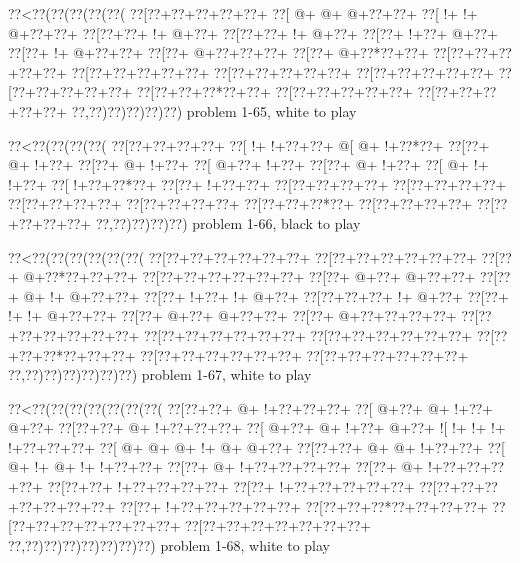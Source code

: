 \vbox{\vbox{\goo
\0??<\0??(\0??(\0??(\0??(\0??(
\0??[\0??+\0??+\0??+\0??+\0??+
\0??[\- @+\- @+\- @+\0??+\0??+
\0??[\- !+\- !+\- @+\0??+\0??+
\0??[\0??+\0??+\- !+\- @+\0??+
\0??[\0??+\0??+\- !+\- @+\0??+
\0??[\0??+\- !+\0??+\- @+\0??+
\0??[\0??+\- !+\- @+\0??+\0??+
\0??[\0??+\- @+\0??+\0??+\0??+
\0??[\0??+\- @+\0??*\0??+\0??+
\0??[\0??+\0??+\0??+\0??+\0??+
\0??[\0??+\0??+\0??+\0??+\0??+
\0??[\0??+\0??+\0??+\0??+\0??+
\0??[\0??+\0??+\0??+\0??+\0??+
\0??[\0??+\0??+\0??+\0??+\0??+
\0??[\0??+\0??+\0??*\0??+\0??+
\0??[\0??+\0??+\0??+\0??+\0??+
\0??[\0??+\0??+\0??+\0??+\0??+
\0??,\0??)\0??)\0??)\0??)\0??)
}
\hfil problem 1-65, white to play\hfil\break
}

\vbox{\vbox{\goo
\0??<\0??(\0??(\0??(\0??(
\0??[\0??+\0??+\0??+\0??+
\0??[\- !+\- !+\0??+\0??+
\- @[\- @+\- !+\0??*\0??+
\0??[\0??+\- @+\- !+\0??+
\0??[\0??+\- @+\- !+\0??+
\0??[\- @+\0??+\- !+\0??+
\0??[\0??+\- @+\- !+\0??+
\0??[\- @+\- !+\- !+\0??+
\0??[\- !+\0??+\0??*\0??+
\0??[\0??+\- !+\0??+\0??+
\0??[\0??+\0??+\0??+\0??+
\0??[\0??+\0??+\0??+\0??+
\0??[\0??+\0??+\0??+\0??+
\0??[\0??+\0??+\0??+\0??+
\0??[\0??+\0??+\0??*\0??+
\0??[\0??+\0??+\0??+\0??+
\0??[\0??+\0??+\0??+\0??+
\0??,\0??)\0??)\0??)\0??)
}
\hfil problem 1-66, black to play\hfil\break
}

\vbox{\vbox{\goo
\0??<\0??(\0??(\0??(\0??(\0??(\0??(
\0??[\0??+\0??+\0??+\0??+\0??+\0??+
\0??[\0??+\0??+\0??+\0??+\0??+\0??+
\0??[\0??+\- @+\0??*\0??+\0??+\0??+
\0??[\0??+\0??+\0??+\0??+\0??+\0??+
\0??[\0??+\- @+\0??+\- @+\0??+\0??+
\0??[\0??+\- @+\- !+\- @+\0??+\0??+
\0??[\0??+\- !+\0??+\- !+\- @+\0??+
\0??[\0??+\0??+\0??+\- !+\- @+\0??+
\0??[\0??+\- !+\- !+\- @+\0??+\0??+
\0??[\0??+\- @+\0??+\- @+\0??+\0??+
\0??[\0??+\- @+\0??+\0??+\0??+\0??+
\0??[\0??+\0??+\0??+\0??+\0??+\0??+
\0??[\0??+\0??+\0??+\0??+\0??+\0??+
\0??[\0??+\0??+\0??+\0??+\0??+\0??+
\0??[\0??+\0??+\0??*\0??+\0??+\0??+
\0??[\0??+\0??+\0??+\0??+\0??+\0??+
\0??[\0??+\0??+\0??+\0??+\0??+\0??+
\0??,\0??)\0??)\0??)\0??)\0??)\0??)
}
\hfil problem 1-67, white to play\hfil\break
}

\vbox{\vbox{\goo
\0??<\0??(\0??(\0??(\0??(\0??(\0??(\0??(
\0??[\0??+\0??+\- @+\- !+\0??+\0??+\0??+
\0??[\- @+\0??+\- @+\- !+\0??+\- @+\0??+
\0??[\0??+\0??+\- @+\- !+\0??+\0??+\0??+
\0??[\- @+\0??+\- @+\- !+\0??+\- @+\0??+
\- ![\- !+\- !+\- !+\- !+\0??+\0??+\0??+
\0??[\- @+\- @+\- @+\- !+\- @+\- @+\0??+
\0??[\0??+\0??+\- @+\- @+\- !+\0??+\0??+
\0??[\- @+\- !+\- @+\- !+\- !+\0??+\0??+
\0??[\0??+\- @+\- !+\0??+\0??+\0??+\0??+
\0??[\0??+\- @+\- !+\0??+\0??+\0??+\0??+
\0??[\0??+\0??+\- !+\0??+\0??+\0??+\0??+
\0??[\0??+\- !+\0??+\0??+\0??+\0??+\0??+
\0??[\0??+\0??+\0??+\0??+\0??+\0??+\0??+
\0??[\0??+\- !+\0??+\0??+\0??+\0??+\0??+
\0??[\0??+\0??+\0??*\0??+\0??+\0??+\0??+
\0??[\0??+\0??+\0??+\0??+\0??+\0??+\0??+
\0??[\0??+\0??+\0??+\0??+\0??+\0??+\0??+
\0??,\0??)\0??)\0??)\0??)\0??)\0??)\0??)
}
\hfil problem 1-68, white to play\hfil\break
}

